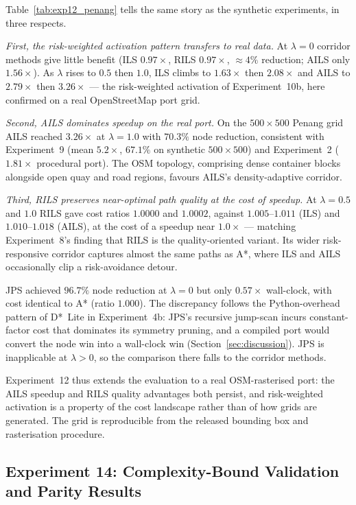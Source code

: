 \documentclass[preprint,12pt,authoryear]{elsarticle}
\begin{document}
Table~\ref{tab:exp12_penang} tells the same story as the synthetic experiments, in three respects.

\emph{First, the risk-weighted activation pattern transfers to real data.}
At $\lambda = 0$ corridor methods give little benefit (ILS $0.97\times$, RILS $0.97\times$, $\approx 4\%$ reduction; AILS only $1.56\times$). As $\lambda$ rises to $0.5$ then $1.0$, ILS climbs to $1.63\times$ then $2.08\times$ and AILS to $2.79\times$ then $3.26\times$ --- the risk-weighted activation of Experiment~10b, here confirmed on a real OpenStreetMap port grid.

\emph{Second, AILS dominates speedup on the real port.}
On the $500 \times 500$ Penang grid AILS reached $3.26\times$ at $\lambda = 1.0$ with $70.3\%$ node reduction, consistent with Experiment~9 (mean $5.2\times$, $67.1\%$ on synthetic $500 \times 500$) and Experiment~2 ($1.81\times$ procedural port). The OSM topology, comprising dense container blocks alongside open quay and road regions, favours AILS's density-adaptive corridor.

\emph{Third, RILS preserves near-optimal path quality at the cost of speedup.}
At $\lambda = 0.5$ and $1.0$ RILS gave cost ratios $1.0000$ and $1.0002$, against $1.005$--$1.011$ (ILS) and $1.010$--$1.018$ (AILS), at the cost of a speedup near $1.0\times$ --- matching Experiment~8's finding that RILS is the quality-oriented variant. Its wider risk-responsive corridor captures almost the same paths as A*, where ILS and AILS occasionally clip a risk-avoidance detour.

JPS achieved $96.7\%$ node reduction at $\lambda = 0$ but only $0.57\times$ wall-clock, with cost identical to A* (ratio $1.000$). The discrepancy follows the Python-overhead pattern of D*~Lite in Experiment~4b: JPS's recursive jump-scan incurs constant-factor cost that dominates its symmetry pruning, and a compiled port would convert the node win into a wall-clock win (Section~\ref{sec:discussion}). JPS is inapplicable at $\lambda > 0$, so the comparison there falls to the corridor methods.

Experiment~12 thus extends the evaluation to a real OSM-rasterised port: the AILS speedup and RILS quality advantages both persist, and risk-weighted activation is a property of the cost landscape rather than of how grids are generated. The grid is reproducible from the released bounding box and rasterisation procedure.

\subsection{Experiment 14: Complexity-Bound Validation and Parity Results}\label{subsec:exp14_results}
\end{document}
